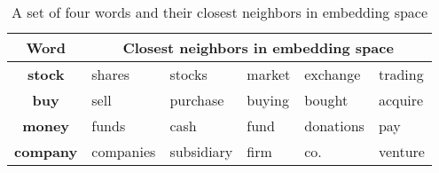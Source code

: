\begin{table}[!ht]
\centering

\begin{tabular}{clllll}
\toprule
\textbf{Word} & \multicolumn{5}{c}{\textbf{Closest neighbors in embedding space}}\\
\midrule

\textbf{stock} & shares & stocks & market & exchange & trading\\
\textbf{buy} & sell & purchase & buying & bought & acquire\\
\textbf{money} & funds & cash & fund & donations & pay\\
\textbf{company} & companies & subsidiary & firm & co. & venture\\

\bottomrule
\end{tabular}
\caption{A set of four words and their closest neighbors in embedding space}
\label{table-glove-demo}
\end{table}